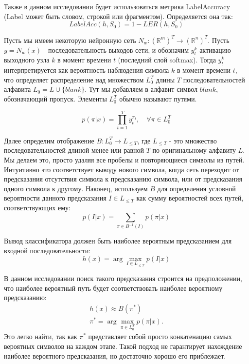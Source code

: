 Также в данном исследовании будет использоваться метрика LabelAccuracy (Label может быть словом, строкой или фрагментом). Определяется она так:
\begin{equation}
	LabelAcc(h, S_0) = 1 - LER(h, S_0)
\end{equation}


Пусть мы имеем некоторую нейронную сеть $N_w : (\mathbb{R}^m)^T \rightarrow (\mathbb{R}^n)^T$. Пусть $y = N_w(x)$ - последовательность выходов сети, и обозначим $y_t^k$ активацию выходного узла $k$ в момент времени $t$ (последний слой softmax). Тогда $y_t^k$ интерпретируется как вероятность наблюдения символа $k$ в момент времени $t$, что определяет распределение над множеством $L_{0}^T$ длины $T$ последовательностей алфавита $L_0 = L \cup \{blank\}$. Тут мы добавляем в алфавит символ $blank$, обозначающий пропуск. Элементы $L_0^T$ обычно называют путями.

\begin{equation}
	p(\pi|x) = \prod_{t=1}^{T} y_t^{\pi_t}, \quad \forall \pi \in L_{0}^{T}
\end{equation}

Далее определим отображение $B: L_{0}^T \rightarrow L_{\leq T}$, где $L_{\leq T}$ - это множество последовательностей длиной менее или равной $T$ по оригинальному алфавиту $L$. Мы делаем это, просто удаляя все пробелы и повторяющиеся символы из путей. Интуитивно это соответствует выводу нового символа, когда сеть переходит от предсказания отсутствия символа к предсказанию символа, или от предсказания одного символа к другому. Наконец, используем $B$ для определения условной вероятности данного предсказания $I \in L_{\leq T}$ как сумму вероятностей всех путей, соответствующих ему:
\begin{equation}
	p(I|x) = \sum_{\pi \in B^{-1}(I)} p(\pi|x)
\end{equation}

Вывод классификатора должен быть наиболее вероятным предсказанием для входной последовательности:
\begin{equation}
	h(x) = \arg\max_{I \in L_{\leq T}} p(I|x)
\end{equation}

В данном исследовании поиск такого предсказания строится на предположении, что наиболее вероятный путь будет соответствовать наиболее вероятному предсказанию:
\begin{equation}
\begin{split}
	h(x) \approx B(\pi^{*}) \\
	\pi^{*} = \arg\max_{\pi \in L_0^T} p(\pi|x).
\end{split}
\end{equation}
Это легко найти, так как $\pi^{*}$ представляет собой просто конкатенацию самых вероятных символов на каждом этапе. Такой подход не гарантирует нахождение наиболее вероятного предсказания, но достаточно хорошо его приблежает. 

